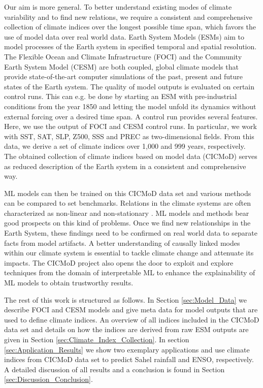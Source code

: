 \documentclass{CUP-JNL-DTM}%
\theoremstyle{definition}
\numberwithin{equation}{section}
\begin{document}
Our aim is more general. To better understand existing modes of climate variability and to find new relations, we require a consistent and comprehensive collection of climate indices over the longest possible time span, which favors the use of model data over real world data. Earth System Models (ESMs) aim to model processes of the Earth system in specified temporal and spatial resolution. The Flexible Ocean and Climate Infrastructure (FOCI) \cite{Matthes2020} and the Community Earth System Model (CESM) \cite{Hurrell2013} are both coupled, global climate models that provide state-of-the-art computer simulations of the past, present and future states of the Earth system. The quality of model outputs is evaluated on certain control runs. This can e.g. be done by starting an ESM with pre-industrial conditions from the year 1850 and letting the model unfold its dynamics without external forcing over a desired time span. A control run provides several features. Here, we use the output of FOCI and CESM control runs. In particular, we work with SST, SAT, SLP, Z500, SSS and PREC as two-dimensional fields. From this data, we derive a set of climate indices over 1,000 and 999 years, respectively. The obtained collection of climate indices based on model data (CICMoD) serves as reduced description of the Earth system in a consistent and comprehensive way. 

ML models can then be trained on this CICMoD data set and various methods can be compared to set benchmarks. Relations in the climate systems are often characterized as non-linear and non-stationary \cite{Pak2014,Park2018,Zhang2019}. ML models and methods bear good prospects on this kind of problems. Once we find new relationships in the Earth System, these findings need to be confirmed on real world data to separate facts from model artifacts. A better understanding of causally linked modes within our climate system is essential to tackle climate change and attenuate its impacts. The CICMoD project also opens the door to exploit and explore techniques from the domain of interpretable ML to enhance the explainability of ML models to obtain trustworthy results.

The rest of this work is structured as follows. In Section \ref{sec:Model_Data} we describe FOCI and CESM models and give meta data for model outputs that are used to define climate indices. An overview of all indices included in the CICMoD data set and details on how the indices are derived from raw ESM outputs are given in Section \ref{sec:Climate_Index_Collection}. In section \ref{sec:Application_Results} we show two exemplary applications and use climate indices from CICMoD data set to predict Sahel rainfall and ENSO, respectively. A detailed discussion of all results and a conclusion is found in Section \ref{sec:Discussion_Conclusion}.
\end{document}
